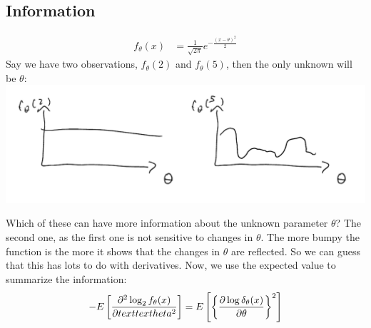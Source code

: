 \documentclass[12 pt]{article}
\begin{document}
\subsection{Information}
\begin{align*}
  f_\theta (x) & = \frac{1}{\sqrt{2\pi}}e^{-\frac{(x-\theta)^2}{2}}
\end{align*}
Say we have two observations, $f_{\theta}(2)$ and $f_{\theta}(5)$,
then the only unknown will be $\theta$:
\\ \includegraphics[width=.9\textwidth]{i6.pdf}

Which of these can have more information about the unknown parameter
$\theta$? The second one, as the first one is not sensitive to changes
in $\theta$. The more bumpy the function is the more it shows that the
changes in $\theta$ are reflected. So we can guess that this has lots
to do with derivatives. Now, we use the expected value to summarize
the information:
$$-E \left[\frac{\partial^2\log_2f_{\theta}(x)}{\partial
    \\text{text}heta^2}\right] = E \left[\left\{\frac{\partial \log
      \delta_\theta(x)}{\partial \theta}\right\}^2\right] $$
\end{document}
